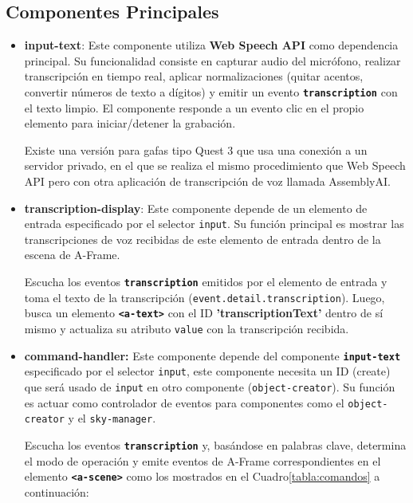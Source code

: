\documentclass[a4paper, 12pt]{book}
\begin{document}
\subsection{Componentes Principales}
\begin{itemize}
  \setlength\itemsep{0.3em}
\setlength\parskip{0pt}  
  \item \textbf{input-text}:
  Este componente utiliza \textbf{Web Speech API} como dependencia principal.
Su funcionalidad consiste en capturar audio del micrófono, realizar transcripción en tiempo real, aplicar normalizaciones (quitar acentos, convertir números de texto a dígitos) y emitir un evento \texttt{\textbf{transcription}} con el texto limpio.
El componente responde a un evento clic en el propio elemento para iniciar/detener la grabación.

Existe una versión para gafas tipo Quest 3 que usa una conexión a un servidor privado, en el que se realiza el mismo procedimiento que Web Speech API pero con otra aplicación de transcripción de voz llamada AssemblyAI.
  \item \textbf{transcription-display}:
Este componente depende de un elemento de entrada especificado por el selector \texttt{input}.
Su función principal es mostrar las transcripciones de voz recibidas de este elemento de entrada dentro de la escena de A-Frame.

Escucha los eventos \texttt{\textbf{transcription}} emitidos por el elemento de entrada y toma el texto de la transcripción (\texttt{event.detail.transcription}). Luego, busca un elemento \texttt{\textbf{<a-text>}} con el ID \textbf{'transcriptionText'} dentro de sí mismo y actualiza su atributo \texttt{value} con la transcripción recibida.
  \item \textbf{command-handler:}
Este componente depende del componente \texttt{\textbf{input-text}} especificado por el selector \texttt{input}, este componente necesita un ID (create) que será usado de \texttt{input} en otro componente (\texttt{object-creator}).
Su función es actuar como controlador de eventos para componentes como el \texttt{object-creator} y el \texttt{sky-manager}.

Escucha los eventos \texttt{\textbf{transcription}} y, basándose en palabras clave, determina el modo de operación y emite eventos de A-Frame correspondientes en el elemento \texttt{\textbf{<a-scene>}} como los mostrados en el Cuadro\ref{tabla:comandos} a continuación:


\end{itemize}
\end{document}
